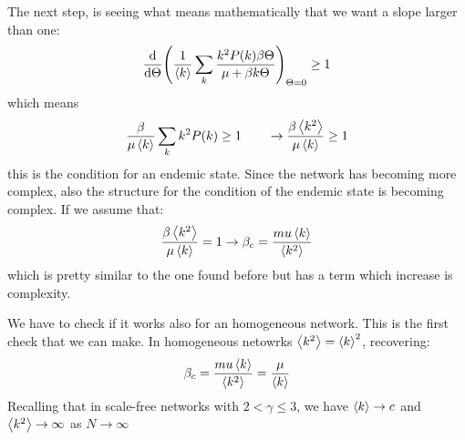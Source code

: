 \documentclass[../main/main.tex]{subfiles}
\begin{document}
The next step, is seeing what means mathematically that we want a slope larger than one:
\begin{equation*}
  \dv{}{\Theta }  \qty( \frac{1}{\expval{k} } \sum_{k}^{} \frac{k^2 P(k) \beta \Theta }{\mu + \beta k \Theta } )_{\Theta =0} \ge 1
\end{equation*}
which means
\begin{equation*}
\frac{\beta }{\mu \expval{k} } \sum_{k}^{}k^2 P(k) \ge 1 \qquad \rightarrow  \frac{\beta \expval{k^2} }{\mu \expval{k} } \ge 1
\end{equation*}
this is the condition for an endemic state. Since the network has becoming more complex, also the structure for the condition of the endemic state is becoming complex.
If we assume that:
\begin{equation*}
 \frac{\beta \expval{k^2} }{\mu \expval{k} } = 1 \rightarrow \beta _c = \frac{mu \expval{k} }{\expval{k^2} }
\end{equation*}
which is pretty similar to the one found before but has a term which increase is complexity.

We have to check if it works also for an homogeneous network. This is the first check that we can make. In homogeneous netowrks \( \expval{k^2} = \expval{k}^2   \), recovering:
\begin{equation*}
  \beta _c = \frac{mu \expval{k} }{\expval{k^2} } = \frac{\mu }{\expval{k} }
\end{equation*}
Recalling that in scale-free networks with \( 2 < \gamma \le 3  \), we have \( \expval{k} \rightarrow c  \) and \( \expval{k^2}  \rightarrow \infty  \) as \( N \rightarrow \infty  \)
\end{document}

